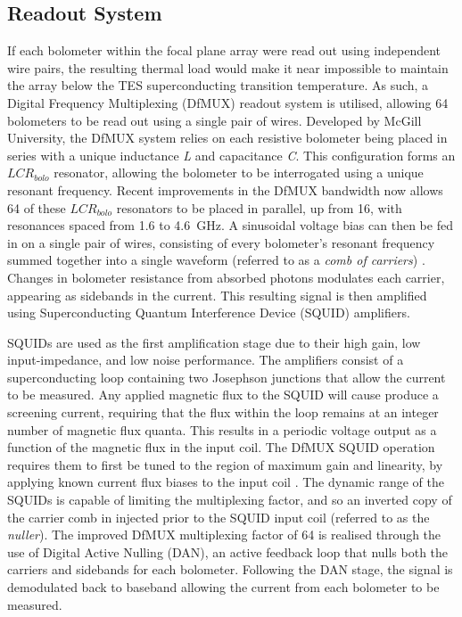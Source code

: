 \documentclass[iop]{emulateapj}
\begin{document}
\subsection{Readout System}

If each bolometer within the focal plane array were read out using independent wire pairs, the resulting thermal load would make it near impossible to maintain the array below the TES superconducting transition temperature.  As such, a Digital Frequency Multiplexing (DfMUX) readout system is utilised, allowing 64 bolometers to be read out using a single pair of wires.  Developed by McGill University, the DfMUX system relies on each resistive bolometer being placed in series with a unique inductance \textit{L} and capacitance \textit{C}.  This configuration forms an $LCR_{bolo}$ resonator, allowing the bolometer to be interrogated using a unique resonant frequency.  Recent improvements in the DfMUX bandwidth now allows 64 of these $LCR_{bolo}$ resonators to be placed in parallel, up from 16, with resonances spaced from 1.6 to 4.6~GHz.  A sinusoidal voltage bias can then be fed in on a single pair of wires, consisting of every bolometer's resonant frequency summed together into a single waveform (referred to as a \textit{comb of carriers}) \citep{bender_digital_2014}.  Changes in bolometer resistance from absorbed photons modulates each carrier, appearing as sidebands in the current.  This resulting signal is then amplified using Superconducting Quantum Interference Device (SQUID) amplifiers.

SQUIDs are used as the first amplification stage due to their high gain, low input-impedance, and low noise performance.  The amplifiers consist of a superconducting loop containing two Josephson junctions that allow the current to be measured.  Any applied magnetic flux to the SQUID will cause produce a screening current, requiring that the flux within the loop remains at an integer number of magnetic flux quanta.  This results in a periodic voltage output as a function of the magnetic flux in the input coil.  The DfMUX SQUID operation requires them to first be tuned to the region of maximum gain and linearity, by applying known current flux biases to the input coil \citep{bender_digital_2014}.  The dynamic range of the SQUIDs is capable of limiting the multiplexing factor, and so an inverted copy of the carrier comb in injected prior to the SQUID input coil (referred to as the \textit{nuller}).  The improved DfMUX multiplexing factor of 64 is realised through the use of Digital Active Nulling (DAN), an active feedback loop that nulls both the carriers and sidebands for each bolometer.  Following the DAN stage, the signal is demodulated back to baseband allowing the current from each bolometer to be measured.
\end{document}
